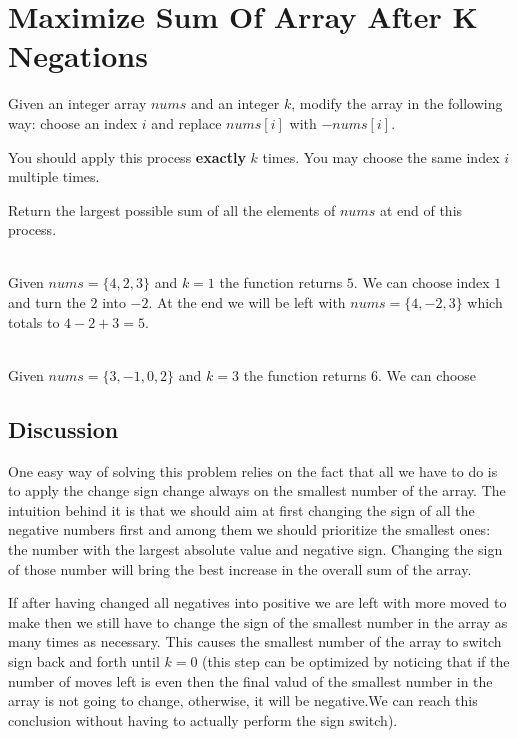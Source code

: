 
\section{Maximize Sum Of Array After K Negations}
\begin{exercise}
    Given an integer array $nums$ and an integer $k$, modify the array in the following way: choose an index $i$ and replace $nums[i]$ with $-nums[i]$.
    
    You should apply this process \textbf{exactly} $k$ times. You may choose the same index $i$ multiple times.
    
    Return the largest possible sum of all the elements of $nums$ at end of this process.     
    \begin{example}
        \label{ex:nary-treedepth:example1}
        \hfill \\
        Given $nums=\{4,2,3\}$ and $k=1$ the function returns $5$. We can choose index $1$ and turn the $2$ into $-2$. At the end we will be left with $nums=\{4,-2,3\}$ which totals to $4-2+3=5$.
    \end{example}
    
    \begin{example}
        \label{ex:nary-treedepth:example2}
        \hfill \\
        Given $nums=\{3,-1,0,2\}$ and $k=3$ the function returns $6$. We can choose 
    \end{example}


    \end{exercise}
 

\subsection{Discussion}
One easy way of solving this problem relies on the fact that all we have to do is to apply the change sign change always on the smallest number of the array.
The intuition behind it is that we should aim at first changing the sign of all the negative numbers first and among them we should prioritize the smallest ones: the number with the largest absolute value and negative sign. Changing the sign of those number will bring the best increase in the overall sum of the array.

If after having changed all negatives into positive we are left with more moved to make then we still have to change the sign of the smallest number in the array as many times as necessary.
This causes the smallest number of the array to switch sign back and forth until $k=0$ (this step can be optimized by noticing that if the number of moves left is even then the final valud of the smallest number in the array is not going to change, otherwise, it will be negative.We can reach this conclusion without having to actually perform the sign switch). 

